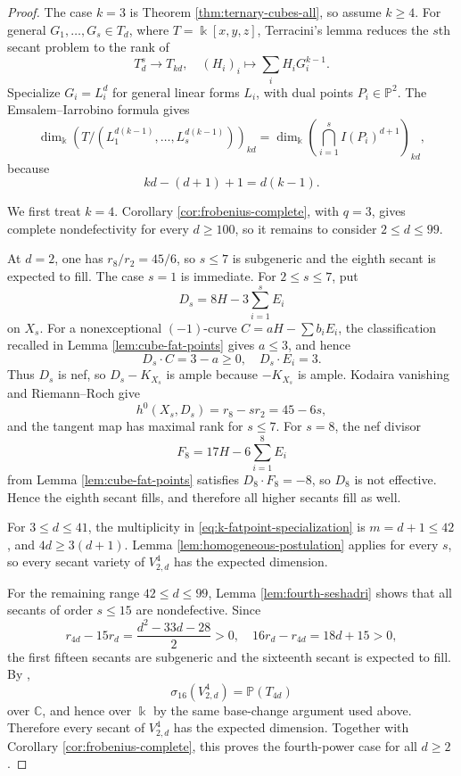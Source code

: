 \documentclass[11pt]{amsart}
\theoremstyle{remark}
\newcommand{\PP}{\mathbb P}
\newcommand{\kk}{\Bbbk}
\begin{document}
\begin{proof}
The case $k=3$ is Theorem \ref{thm:ternary-cubes-all}, so assume $k\ge4$. For general $G_1,\ldots,G_s\in T_d$, where $T=\kk[x,y,z]$, Terracini's lemma reduces the $s$th secant problem to the rank of
\begin{equation}\label{eq:k-tangent-map}
T_d^s\longrightarrow T_{kd},
\quad
(H_i)_i\longmapsto\sum_i H_iG_i^{k-1}.
\end{equation}
Specialize $G_i=L_i^d$ for general linear forms $L_i$, with dual points $P_i\in\PP^2$. The Emsalem--Iarrobino formula gives
\begin{equation}\label{eq:k-fatpoint-specialization}
\dim_{\kk}\left(T/(L_1^{d(k-1)},\ldots,L_s^{d(k-1)})\right)_{kd}
=
\dim_{\kk}\left(\bigcap_{i=1}^sI(P_i)^{d+1}\right)_{kd},
\end{equation}
because
$$
kd-(d+1)+1=d(k-1).
$$

We first treat $k=4$. Corollary \ref{cor:frobenius-complete}, with $q=3$, gives complete nondefectivity for every $d\ge100$, so it remains to consider $2\le d\le99$.

At $d=2$, one has $r_8/r_2=45/6$, so $s\le7$ is subgeneric and the eighth secant is expected to fill. The case $s=1$ is immediate. For $2\le s\le7$, put
$$
D_s=8H-3\sum_{i=1}^sE_i
$$
on $X_s$. For a nonexceptional $(-1)$-curve $C=aH-\sum b_iE_i$, the classification recalled in Lemma \ref{lem:cube-fat-points} gives $a\le3$, and hence
$$
D_s\cdot C=3-a\ge0,
\quad
D_s\cdot E_i=3.
$$
Thus $D_s$ is nef, so $D_s-K_{X_s}$ is ample because $-K_{X_s}$ is ample. Kodaira vanishing and Riemann--Roch give
$$
h^0(X_s,D_s)=r_8-sr_2=45-6s,
$$
and the tangent map has maximal rank for $s\le7$. For $s=8$, the nef divisor
$$
F_8=17H-6\sum_{i=1}^8E_i
$$
from Lemma \ref{lem:cube-fat-points} satisfies $D_8\cdot F_8=-8$, so $D_8$ is not effective. Hence the eighth secant fills, and therefore all higher secants fill as well.

For $3\le d\le41$, the multiplicity in \eqref{eq:k-fatpoint-specialization} is $m=d+1\le42$, and $4d\ge3(d+1)$. Lemma \ref{lem:homogeneous-postulation} applies for every $s$, so every secant variety of $V^4_{2,d}$ has the expected dimension.

For the remaining range $42\le d\le99$, Lemma \ref{lem:fourth-seshadri} shows that all secants of order $s\le15$ are nondefective. Since
$$
r_{4d}-15r_d=\frac{d^2-33d-28}{2}>0,
\quad
16r_d-r_{4d}=18d+15>0,
$$
the first fifteen secants are subgeneric and the sixteenth secant is expected to fill. By \cite[Theorem~4]{FOS},
$$
\sigma_{16}(V^4_{2,d})=\PP(T_{4d})
$$
over $\mathbb C$, and hence over $\kk$ by the same base-change argument used above. Therefore every secant of $V^4_{2,d}$ has the expected dimension. Together with Corollary \ref{cor:frobenius-complete}, this proves the fourth-power case for all $d\ge2$.


\end{proof}
\end{document}
